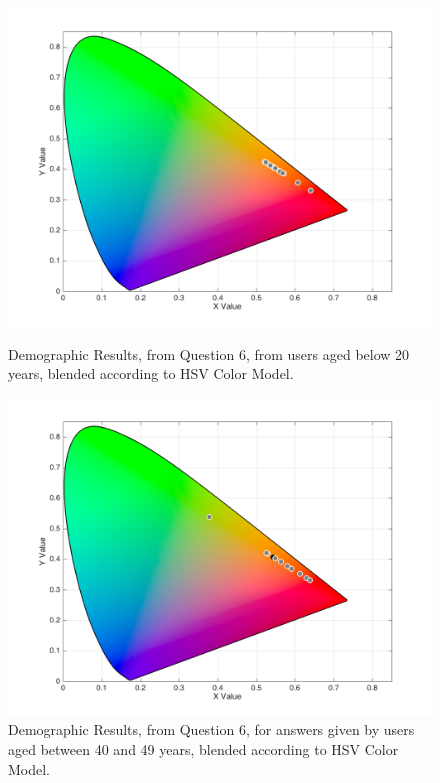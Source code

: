 \begin{figure}[!htbp]
  \centering
  \vspace{-10pt}
  \begin{minipage}{0.4\textwidth}
    \centering
    \includegraphics[width=\textwidth]{images/results/6_demo_age20_HSVresponses.png}
    \caption[Demographic Results, Question 6, Age below 20 years, according to HSV.]{Demographic Results, from Question 6, from users aged below 20 years, blended according to HSV Color Model.}
    \label{fig:age_1}
  \end{minipage}
  \begin{minipage}{0.4\textwidth}
    \centering
    \includegraphics[width=\textwidth]{images/results/6_demo_age40_49_HSVresponses.png}
    \caption[Demographic Results, Question 6, Age between 40-49 years, according to HSV.]{Demographic Results, from Question 6, for answers given by users aged between 40 and 49 years, blended according to HSV Color Model.}
    \label{fig:age_2}
  \end{minipage}
  \vspace{-10pt}
\end{figure}
%
